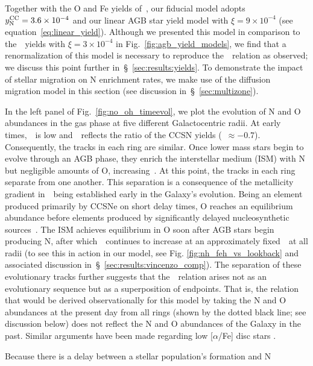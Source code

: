 \documentclass[ms.tex]{subfiles}
\begin{document}
Together with the O and Fe yields of~\citet[][see discussion
in~\S~\ref{sec:yields:ccsne}]{Johnson2021}, our fiducial model adopts
$y_\text{N}^\text{CC} = 3.6\times10^{-4}$ and our linear AGB star yield model with
$\xi = 9\times10^{-4}$ (see equation~\ref{eq:linear_yield}).
Although we presented this model in comparison to the~\cristallo~yields with
$\xi = 3\times10^{-4}$ in Fig.~\ref{fig:agb_yield_models}, we find that a
renormalization of this model is necessary to reproduce the~\ohno~relation as
observed; we discuss this point further in~\S~\ref{sec:results:yields}.
To demonstrate the impact of stellar migration on N enrichment rates, we make
use of the diffusion migration model in this section (see discussion
in~\S~\ref{sec:multizone}).
\par
In the left panel of Fig.~\ref{fig:no_oh_timeevol}, we plot the evolution of N
and O abundances in the gas phase at five different Galactocentric radii.
At early times,~\oh~is low and~\no~reflects the ratio of the CCSN yields
(\no\subcc~$\approx -0.7$).
Consequently, the tracks in each ring are similar.
Once lower mass stars begin to evolve through an AGB phase, they enrich the
interstellar medium (ISM) with N but negligible amounts of O, increasing~\no.
At this point, the tracks in each ring separate from one another.
This separation is a consequence of the metallicity gradient in~\oh~being
established early in the Galaxy's evolution.
Being an element produced primarily by CCSNe on short delay times, O reaches
an equilibrium abundance before elements produced by significantly delayed
nucleosynthetic sources~\citep{Weinberg2017}.
The ISM achieves equilibrium in O soon after AGB stars begin producing N,
after which~\no~continues to increase at an approximately fixed~\oh~at all
radii (to see this in action in our model, see Fig.
\ref{fig:nh_feh_vs_lookback} and associated discussion
in~\S~\ref{sec:results:vincenzo_comp}).
The separation of these evolutionary tracks further suggests that
the~\ohno~relation arises not as an evolutionary sequence but as a
superposition of endpoints.
That is, the relation that would be derived observationally for this model by
taking the N and O abundances at the present day from all rings (shown by the
dotted black line; see discussion below) does not reflect the N and O
abundances of the Galaxy in the past.
Similar arguments have been made regarding low [$\alpha$/Fe] disc stars
\citep[e.g.][]{Schoenrich2009, Nidever2014, Buck2020, Sharma2021}.
\par
Because there is a delay between a stellar population's formation and N
\end{document}
